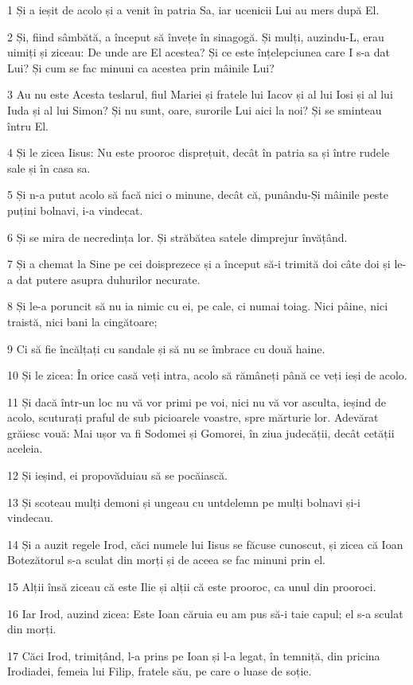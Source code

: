\par 1 Și a ieșit de acolo și a venit în patria Sa, iar ucenicii Lui au mers după El.
\par 2 Și, fiind sâmbătă, a început să învețe în sinagogă. Și mulți, auzindu-L, erau uimiți și ziceau: De unde are El acestea? Și ce este înțelepciunea care I s-a dat Lui? Și cum se fac minuni ca acestea prin mâinile Lui?
\par 3 Au nu este Acesta teslarul, fiul Mariei și fratele lui Iacov și al lui Iosi și al lui Iuda și al lui Simon? Și nu sunt, oare, surorile Lui aici la noi? Și se sminteau întru El.
\par 4 Și le zicea Iisus: Nu este prooroc disprețuit, decât în patria sa și între rudele sale și în casa sa.
\par 5 Și n-a putut acolo să facă nici o minune, decât că, punându-Și mâinile peste puțini bolnavi, i-a vindecat.
\par 6 Și se mira de necredința lor. Și străbătea satele dimprejur învățând.
\par 7 Și a chemat la Sine pe cei doisprezece și a început să-i trimită doi câte doi și le-a dat putere asupra duhurilor necurate.
\par 8 Și le-a poruncit să nu ia nimic cu ei, pe cale, ci numai toiag. Nici pâine, nici traistă, nici bani la cingătoare;
\par 9 Ci să fie încălțați cu sandale și să nu se îmbrace cu două haine.
\par 10 Și le zicea: În orice casă veți intra, acolo să rămâneți până ce veți ieși de acolo.
\par 11 Și dacă într-un loc nu vă vor primi pe voi, nici nu vă vor asculta, ieșind de acolo, scuturați praful de sub picioarele voastre, spre mărturie lor. Adevărat grăiesc vouă: Mai ușor va fi Sodomei și Gomorei, în ziua judecății, decât cetății aceleia.
\par 12 Și ieșind, ei propovăduiau să se pocăiască.
\par 13 Și scoteau mulți demoni și ungeau cu untdelemn pe mulți bolnavi și-i vindecau.
\par 14 Și a auzit regele Irod, căci numele lui Iisus se făcuse cunoscut, și zicea că Ioan Botezătorul s-a sculat din morți și de aceea se fac minuni prin el.
\par 15 Alții însă ziceau că este Ilie și alții că este prooroc, ca unul din prooroci.
\par 16 Iar Irod, auzind zicea: Este Ioan căruia eu am pus să-i taie capul; el s-a sculat din morți.
\par 17 Căci Irod, trimițând, l-a prins pe Ioan și l-a legat, în temniță, din pricina Irodiadei, femeia lui Filip, fratele său, pe care o luase de soție.
